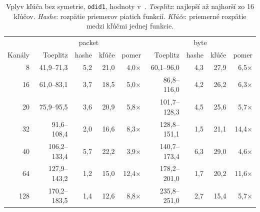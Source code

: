 \begin{table}[ht]
  \centering
  \small
  \caption{Vplyv kľúča bez symetrie, \texttt{odid1}, hodnoty v~\textperthousand. \emph{Toeplitz}: najlepší až najhorší zo 16 kľúčov. \emph{Hashe}: rozpätie priemerov piatich funkcií. \emph{Kľúče}: priemerné rozpätie medzi kľúčmi jednej funkcie.}
  \label{tab:kluce}
  \begin{tabular}{r rrrr rrrr}
    \toprule
    & \multicolumn{4}{c}{packet} & \multicolumn{4}{c}{byte} \\
    Kanály & Toeplitz & hashe & kľúče & pomer & Toeplitz & hashe & kľúče & pomer \\
    \midrule
    8 & 41,9--71,3 & 5,2 & 21,0 & 4,0$\times$ & 60,1--96,0 & 4,3 & 27,9 & 6,5$\times$ \\
    16 & 61,0--83,1 & 3,7 & 18,5 & 5,0$\times$ & 86,8--116,0 & 4,2 & 26,2 & 6,3$\times$ \\
    20 & 75,9--95,5 & 3,6 & 20,9 & 5,8$\times$ & 101,7--128,3 & 4,5 & 25,6 & 5,7$\times$ \\
    32 & 91,6--108,4 & 2,0 & 16,6 & 8,3$\times$ & 128,8--151,1 & 1,5 & 21,1 & 14,4$\times$ \\
    40 & 106,2--133,4 & 5,7 & 22,2 & 3,9$\times$ & 140,7--173,4 & 6,3 & 29,0 & 4,6$\times$ \\
    64 & 127,9--143,2 & 1,2 & 15,0 & 12,4$\times$ & 178,2--201,0 & 1,7 & 20,2 & 11,6$\times$ \\
    128 & 170,2--183,5 & 1,4 & 12,6 & 8,8$\times$ & 235,8--251,0 & 2,7 & 15,4 & 5,7$\times$ \\
    \bottomrule
  \end{tabular}
\end{table}
